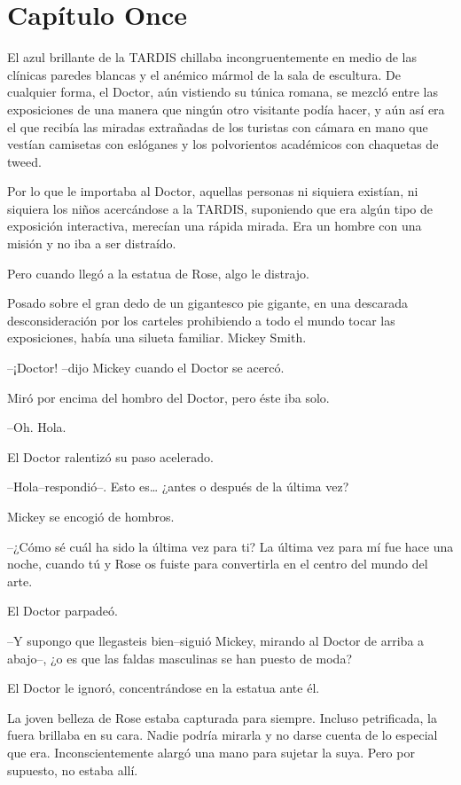 \chapter*{Capítulo Once}

El azul brillante de la TARDIS chillaba incongruentemente en medio de
las clínicas paredes blancas y el anémico mármol de la sala de
escultura. De cualquier forma, el Doctor, aún vistiendo su túnica
romana, se mezcló entre las exposiciones de una manera que ningún otro
visitante podía hacer, y aún así era el que recibía las miradas
extrañadas de los turistas con cámara en mano que vestían camisetas con
eslóganes y los polvorientos académicos con chaquetas de tweed.

Por lo que le importaba al Doctor, aquellas personas ni siquiera
existían, ni siquiera los niños acercándose a la TARDIS, suponiendo que
era algún tipo de exposición interactiva, merecían una rápida mirada.
Era un hombre con una misión y no iba a ser distraído.

Pero cuando llegó a la estatua de Rose, algo le distrajo.

Posado sobre el gran dedo de un gigantesco pie gigante, en una descarada
desconsideración por los carteles prohibiendo a todo el mundo tocar las
exposiciones, había una silueta familiar. Mickey Smith.

--¡Doctor! --dijo Mickey cuando el Doctor se acercó.

Miró por encima del hombro del Doctor, pero éste iba solo.

--Oh. Hola.

El Doctor ralentizó su paso acelerado.

--Hola--respondió--. Esto es\ldots{} ¿antes o después de la última vez?

Mickey se encogió de hombros.

--¿Cómo sé cuál ha sido la última vez para ti? La última vez para mí fue
hace una noche, cuando tú y Rose os fuiste para convertirla en el centro
del mundo del arte.

El Doctor parpadeó.

--Y supongo que llegasteis bien--siguió Mickey, mirando al Doctor de
arriba a abajo--, ¿o es que las faldas masculinas se han puesto de moda?

El Doctor le ignoró, concentrándose en la estatua ante él.

La joven belleza de Rose estaba capturada para siempre. Incluso
petrificada, la fuera brillaba en su cara. Nadie podría mirarla y no
darse cuenta de lo especial que era. Inconscientemente alargó una mano
para sujetar la suya. Pero por supuesto, no estaba allí.

